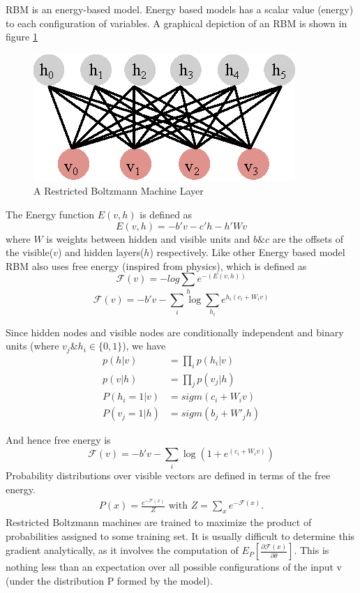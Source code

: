 RBM is an energy-based model. Energy based models has a scalar value (energy) to each configuration of variables. A graphical depiction of an RBM is shown in figure \ref{fig:rbm_layer}
\begin{figure}[!ht]
    \centering
    \includegraphics[scale=0.9]{./imgs/rbm.eps}
    \caption{A Restricted Boltzmann Machine Layer}
    \label{fig:rbm_layer}
\end{figure}%

The Energy function $E(v,h)$ is defined as 
$$E(v,h) = - b'v - c'h - h'Wv$$
where $W$ is weights between hidden and visible units and $b \& c$  are the offsets of the visible($v$) and hidden layers($h$) respectively. Like other Energy based model RBM also uses free energy (inspired from physics), which is defined as
$$\mathcal{F}(v) = -log \sum_{h}{e^{-(E(v,h))}}  $$
$$\mathcal{F}(v) = - b'v - \sum_i \log \sum_{h_i} e^{h_i (c_i + W_i v)}$$

Since hidden nodes and visible nodes are conditionally independent and binary units (where $v_j \& h_i \in \{0,1\}$), we have 
\begin{align}
p(h|v) &= \prod_i p(h_i|v) \\
p(v|h) &= \prod_j p(v_j|h) \\
P(h_i=1|v) &= sigm(c_i + W_i v) \label{eq:rbm_layers_prob1} \\
P(v_j=1|h) &= sigm(b_j + W'_j h) \label{eq:rbm_layers_prob2}  
\end{align}

And hence free energy is 
$$\mathcal{F}(v)= - b'v - \sum_i \log(1 + e^{(c_i + W_i v)})$$ %
Probability distributions over visible vectors are defined in terms of the free energy.
\begin{align*}
P(x) = \frac{e^{-\mathcal{F}(x)}}{Z} \text{ with } Z=\sum_x e^{-\mathcal{F}(x)}.
\end{align*}
Restricted Boltzmann machines are trained to maximize the product of probabilities assigned to some training set. It is usually difficult to determine this gradient analytically, as it involves the computation of $E_P[\frac{\partial \mathcal{F}(x)} {\partial \theta} ]$. This is nothing less than an expectation over all possible configurations of the input v (under the distribution P formed by the model). \cite{hinton2010practical}


